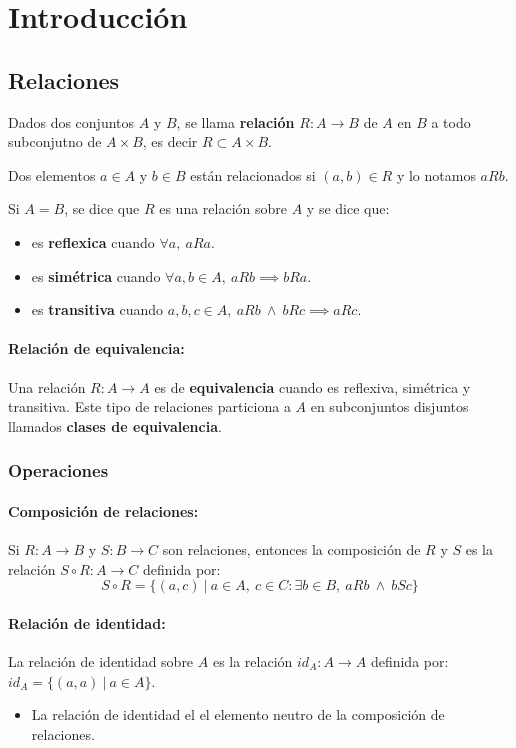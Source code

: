 \section{Introducción}
\subsection{Relaciones}
Dados dos conjuntos \(A\) y \(B\), se llama \textbf{relación} \(R: A \to B\) de \(A\) en \(B\) a todo subconjutno de \(A\times B\), es decir \(R\subset A\times B\).

Dos elementos \(a\in A\) y \(b\in B\) están relacionados si \((a,b)\in R\) y lo notamos \(aRb\).

Si \(A = B\), se dice que \(R\) es una relación sobre \(A\) y se dice que:
\begin{itemize}
  \item es \textbf{reflexica} cuando \(\forall a,~aRa\).
  \item es \textbf{simétrica} cuando \(\forall a,b\in A,~aRb \implies bRa\).
  \item es \textbf{transitiva} cuando \(a,b,c\in A,~aRb~\land~bRc\implies aRc\).
\end{itemize}

\paragraph{Relación de equivalencia:} Una relación \(R:A\to A\) es de \textbf{equivalencia} cuando es reflexiva, simétrica y transitiva. Este tipo de relaciones particiona a \(A\) en subconjuntos disjuntos llamados \textbf{clases de equivalencia}.


\subsubsection{Operaciones}
\paragraph{Composición de relaciones:} Si \(R:A\to B\) y \(S:B\to C\) son relaciones, entonces la composición de \(R\) y \(S\) es la relación \(S\circ R:A\to C\) definida por:
\[S\circ R = \{(a,c)~|~a\in A,~c\in C : \exists b\in B,~aRb~\land~bSc\}\]

\paragraph{Relación de identidad:} La relación de identidad sobre \(A\) es la relación \(id_A:A\to A\) definida por: \(id_A = \{(a,a)~|~a\in A\}\).
\begin{itemize}
  \item La relación de identidad el el elemento neutro de la composición de relaciones.
\end{itemize}

